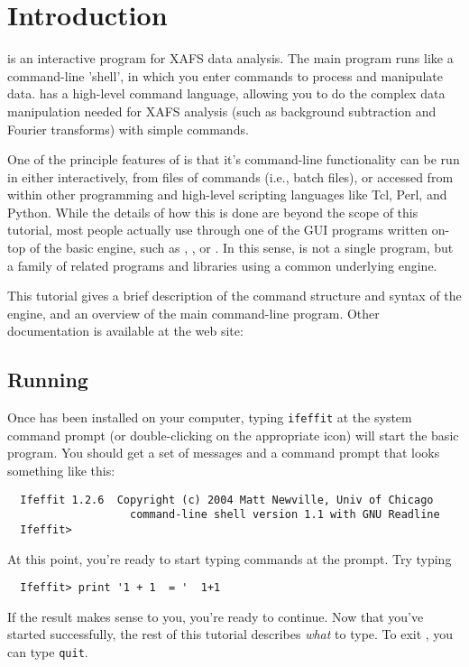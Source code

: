 \documentclass[11pt]{article}
\begin{document}



\section{Introduction}\label{s:intro}

{\ifeffit} is an interactive program for XAFS data analysis.  The main
program runs like a command-line 'shell', in which you enter commands to
process and manipulate data.  {\ifeffit} has a high-level command language,
allowing you to do the complex data manipulation needed for XAFS analysis
(such as background subtraction and Fourier transforms) with simple
commands.

One of the principle features of {\ifeffit} is that it's command-line
functionality can be run in either interactively, from files of commands
(i.e., batch files), or accessed from within other programming and
high-level scripting languages like Tcl, Perl, and Python.  While the
details of how this is done are beyond the scope of this tutorial, most
people actually use {\ifeffit} through one of the GUI programs written
on-top of the basic {\ifeffit} engine, such as {},
{}, or {}.  In this sense, {\ifeffit} is
not a single program, but a family of related programs and libraries using
a common underlying engine.  

This tutorial gives a brief description of the command structure and syntax
of the {\ifeffit} engine, and an overview of the main {\ifeffit}
command-line program.  Other documentation is available at the {\ifeffit}
web site: {\WWWiff}

\subsection{Running {\ifeffit}}
\label{s:running}

Once {\ifeffit} has been installed on your computer, typing {\tt{ifeffit}}
at the system command prompt (or double-clicking on the appropriate icon)
will start the basic {\ifeffit} program.  You should get a set of messages
and a command prompt that looks something like this:
{\small\begin{verbatim}
  Ifeffit 1.2.6  Copyright (c) 2004 Matt Newville, Univ of Chicago
                   command-line shell version 1.1 with GNU Readline
  Ifeffit>
\end{verbatim}}\noindent
At this point, you're ready to start typing {\ifeffit} commands at the
prompt. Try typing
{\small\begin{verbatim}
  Ifeffit> print '1 + 1  = '  1+1

\end{verbatim}}
\noindent
If the result makes sense to you, you're ready to continue.  Now that
you've started {\ifeffit} successfully, the rest of this tutorial describes
{\emph{what}} to type.  To exit {\ifeffit}, you can type {\tt{quit}}.
\end{document}
